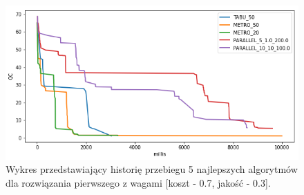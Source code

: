 \begin{figure}[ht]{}
	\centering
	\includegraphics[scale=0.85]{images/solution_1_cqp_2.png}
	\caption {
		 Wykres przedstawiający historię przebiegu 5 najlepszych algorytmów dla rozwiązania pierwszego z wagami [koszt - 0.7, jakość - 0.3]. 
	}
	\label{fig:sol-1-w-2}
\end{figure}


